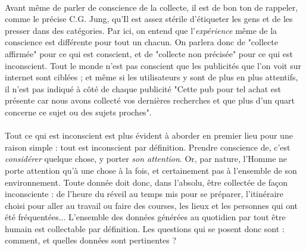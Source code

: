 \paragraph{} Avant même de parler de conscience de la collecte, il est de bon ton de rappeler,
comme le précise C.G. Jung, qu'\guillemotleft Il est assez stérile d'étiqueter les gens et de les presser dans
des catégories\guillemotright. Par ici, on entend que l'\emph{expérience} même de la conscience est différente
pour tout un chacun. On parlera donc de "collecte affirmée" pour ce qui est conscient, et de "collecte non précisée"
pour ce qui est inconscient. Tout le monde n'est pas conscient que les publicités que l'on voit sur internet sont
ciblées ; et même si les utilisateurs y sont de plus en plus attentifs, il n'est pas indiqué à côté de chaque
publicité "Cette pub pour tel achat est présente car nous avons collecté vos dernières recherches et que plus d'un
quart concerne ce sujet ou des sujets proches". 

\paragraph{} Tout ce qui est inconscient est plus évident à aborder en premier lieu pour une raison simple : tout est
inconscient par définition. Prendre conscience de, c'est \emph{considérer} quelque chose, y porter \emph{son attention}.
Or, par nature, l'Homme ne porte attention qu'à une chose à la fois, et certainement pas à l'ensemble de son
environnement. Toute donnée doit donc, dans l'absolu, être collectée de façon inconsciente : de l'heure du réveil au
temps mis pour se préparer, l'itinéraire choisi pour aller au travail ou faire des courses, les lieux et les personnes
qui ont été fréquentées... L'ensemble des données générées au quotidien par tout être humain est collectable par
définition. Les questions qui se posent donc sont : comment, et quelles données sont pertinentes ?


